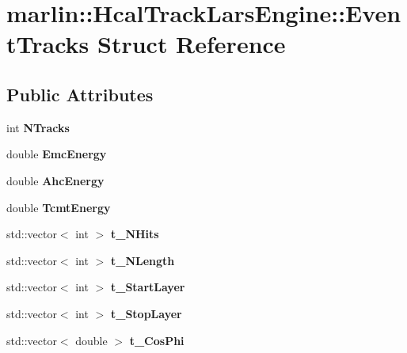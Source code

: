 \section{marlin\-:\-:Hcal\-Track\-Lars\-Engine\-:\-:Event\-Tracks Struct Reference}
\label{structmarlin_1_1HcalTrackLarsEngine_1_1EventTracks}
\subsection*{Public Attributes}
\begin{DoxyCompactItemize}
\item 
int {\bfseries N\-Tracks}\label{structmarlin_1_1HcalTrackLarsEngine_1_1EventTracks_ae87dbd7da4cc6dea1d5ea2d86033e302}

\item 
double {\bfseries Emc\-Energy}\label{structmarlin_1_1HcalTrackLarsEngine_1_1EventTracks_a6a7cc3e2b797fac98b3cf316d1760175}

\item 
double {\bfseries Ahc\-Energy}\label{structmarlin_1_1HcalTrackLarsEngine_1_1EventTracks_a7e762ef4b89e12fb6b9930eb21aa0dc6}

\item 
double {\bfseries Tcmt\-Energy}\label{structmarlin_1_1HcalTrackLarsEngine_1_1EventTracks_a32a6dfc958c87cfe63e6ee1fe8eb3b94}

\item 
std\-::vector$<$ int $>$ {\bfseries t\-\_\-\-N\-Hits}\label{structmarlin_1_1HcalTrackLarsEngine_1_1EventTracks_a17f7761dc8374a674603d7d63509741d}

\item 
std\-::vector$<$ int $>$ {\bfseries t\-\_\-\-N\-Length}\label{structmarlin_1_1HcalTrackLarsEngine_1_1EventTracks_ad1f9c691180d4349a10f7fc66083744e}

\item 
std\-::vector$<$ int $>$ {\bfseries t\-\_\-\-Start\-Layer}\label{structmarlin_1_1HcalTrackLarsEngine_1_1EventTracks_ab78dc8f8a90b65b1af9ce341a7a8901b}

\item 
std\-::vector$<$ int $>$ {\bfseries t\-\_\-\-Stop\-Layer}\label{structmarlin_1_1HcalTrackLarsEngine_1_1EventTracks_afab02710e874a19cb735cfc761d0254c}

\item 
std\-::vector$<$ double $>$ {\bfseries t\-\_\-\-Cos\-Phi}\label{structmarlin_1_1HcalTrackLarsEngine_1_1EventTracks_ade43ae36b4ba86a585af05a5300de2d2}


\end{DoxyCompactItemize}
